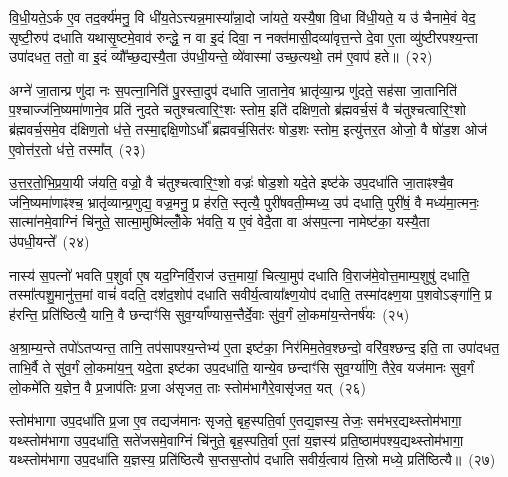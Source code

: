 वि॒धी॒यते॒\-ऽर्क ए॒व तद॒र्क्य॑मनु॒ वि धी॑य॒ते\-ऽत्त्यन्न॒मास्या᳚न्ना॒दो जा॑यते॒ यस्यै॒षा वि॒धा वि॑धी॒यते॒ य उ॑ चैनामे॒वं वेद॒ सृष्टी॒रुप॑ दधाति यथासृ॒ष्टमे॒वाव॑ रुन्द्धे॒ न वा इ॒दं दिवा॒ न नक्त॑मासी॒दव्या॑वृत्त॒न्ते दे॒वा ए॒ता व्यु॑ष्टीरपश्य॒न्ता उपा॑दधत॒ ततो॒ वा इ॒दं व्यौ᳚च्छ॒द्यस्यै॒ता उ॑पधी॒यन्ते॒ व्ये॑वास्मा॑ उच्छ॒त्यथो॒ तम॑ ए॒वाप॑ हते॥~(२२)

{\anuvakamend[{वै ज॒नित्रं॑ पञ्चद॒शो\-ऽदि॑त्यै भा॒गो वै ध॒र्त्रः स॒माव॑द्वीर्यौ वि॒धा ततो॒ वा इ॒दं चतु॑र्दश च}]}%

अग्ने॑ जा॒तान्प्र णु॑दा नः स॒पत्ना॒निति॑ पु॒रस्ता॒दुप॑ दधाति जा॒ताने॒व भ्रातृ॑व्या॒न्प्र णु॑दते॒ सह॑सा जा॒तानिति॑ प॒श्चाज्ज॑नि॒ष्यमा॑णाने॒व प्रति॑ नुदते चतुश्चत्वारि॒ꣳ॒शः स्तोम॒ इति॑ दक्षिण॒तो ब्र॑ह्मवर्च॒सं वै च॑तुश्चत्वारि॒ꣳ॒शो ब्र॑ह्मवर्च॒समे॒व द॑क्षिण॒तो ध॑त्ते॒ तस्मा॒द्दक्षि॒णो\-ऽर्धो᳚ ब्रह्मवर्च॒सित॑रः षोड॒शः स्तोम॒ इत्यु॑त्तर॒त ओजो॒ वै षो॑ड॒श ओज॑ ए॒वोत्त॑र॒तो ध॑त्ते॒ तस्मा᳚त्~(२३)

उ॒त्त॒र॒तो॒भि॒प्र॒या॒यी ज॑यति॒ वज्रो॒ वै च॑तुश्चत्वारि॒ꣳ॒शो वज्रः॑ षोड॒शो यदे॒ते इष्ट॑के उप॒दधा॑ति जा॒ताꣴश्चै॒व ज॑नि॒ष्यमा॑णाꣴश्च॒ भ्रातृ॑व्यान्प्र॒णुद्य॒ वज्र॒मनु॒ प्र ह॑रति॒ स्तृत्यै॒ पुरी॑षवती॒म्मध्य॒ उप॑ दधाति॒ पुरी॑षं॒ वै मध्य॑मा॒त्मनः॒ सात्मा॑नमे॒वाग्निं चि॑नुते॒ सात्मा॒मुष्मि॑ल्लोँ॒के भ॑वति॒ य ए॒वं वेदै॒ता वा अ॑सप॒त्ना नामेष्ट॑का॒ यस्यै॒ता उ॑पधी॒यन्ते᳚~(२४)

नास्य॑ स॒पत्नो॑ भवति प॒शुर्वा ए॒ष यद॒ग्निर्वि॒राज॑ उत्त॒मायां॒ चित्या॒मुप॑ दधाति वि॒राज॑मे॒वोत्त॒माम्प॒शुषु॑ दधाति॒ तस्मा᳚त्पशु॒मानु॑त्त॒मां वाचं॑ वदति॒ दश॑द॒शोप॑ दधाति सवीर्य॒त्वाया᳚क्ष्ण॒योप॑ दधाति॒ तस्मा॑दक्ष्ण॒या प॒शवो\-ऽङ्गा॑नि॒ प्र ह॑रन्ति॒ प्रति॑ष्ठित्यै॒ यानि॒ वै छन्दाꣳ॑सि सुव॒र्ग्या᳚ण्यास॒न्तैर्दे॒वाः सु॑व॒र्गं लो॒कमा॑य॒न्तेनर्\mbox{}ष॑यः~(२५)

अ॒श्रा॒म्य॒न्ते तपो॑\-ऽतप्यन्त॒ तानि॒ तप॑सापश्य॒न्तेभ्य॑ ए॒ता इष्ट॑का॒ निर॑मिम॒तेव॒श्छन्दो॒ वरि॑व॒श्छन्द॒ इति॒ ता उपा॑दधत॒ ताभि॒र्वै ते सु॑व॒र्गं लो॒कमा॑य॒न्॒ यदे॒ता इष्ट॑का उप॒दधा॑ति॒ यान्ये॒व छन्दाꣳ॑सि सुव॒र्ग्या॑णि॒ तैरे॒व यज॑मानः सुव॒र्गं लो॒कमे॑ति य॒ज्ञेन॒ वै प्र॒जाप॑तिः प्र॒जा अ॑सृजत॒ ताः स्तोम॑भागैरे॒वासृ॑जत॒ यत्~(२६)

स्तोम॑भागा उप॒दधा॑ति प्र॒जा ए॒व तद्यज॑मानः सृजते॒ बृह॒स्पति॒र्वा ए॒तद्य॒ज्ञस्य॒ तेजः॒ सम॑भर॒द्यथ्स्तोम॑भागा॒ यथ्स्तोम॑भागा उप॒दधा॑ति॒ सते॑जसमे॒वाग्निं चि॑नुते॒ बृह॒स्पति॒र्वा ए॒तां य॒ज्ञस्य॑ प्रति॒ष्ठाम॑पश्य॒द्यथ्स्तोम॑भागा॒ यथ्स्तोम॑भागा उप॒दधा॑ति य॒ज्ञस्य॒ प्रति॑ष्ठित्यै स॒प्तस॒प्तोप॑ दधाति सवीर्य॒त्वाय॑ ति॒स्रो मध्ये॒ प्रति॑ष्ठित्यै॥~(२७)

